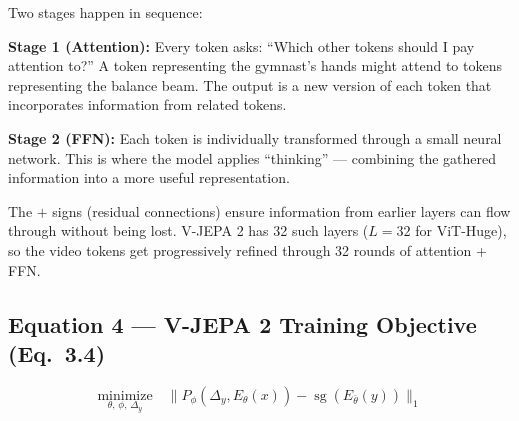 \documentclass[12pt, a4paper]{article}
\begin{document}
\begin{analogybox}
Two stages happen in sequence:

\textbf{Stage 1 (Attention):} Every token asks: ``Which other tokens should I pay attention to?'' A token representing the gymnast's hands might attend to tokens representing the balance beam. The output is a new version of each token that incorporates information from related tokens.

\textbf{Stage 2 (FFN):} Each token is individually transformed through a small neural network. This is where the model applies ``thinking'' --- combining the gathered information into a more useful representation.

The $+$ signs (residual connections) ensure information from earlier layers can flow through without being lost. V-JEPA 2 has 32 such layers ($L=32$ for ViT-Huge), so the video tokens get progressively refined through 32 rounds of attention + FFN.
\end{analogybox}


\subsection{Equation 4 --- V-JEPA 2 Training Objective (Eq.~3.4)}

\begin{eqbox}
\[
\underset{\theta,\,\phi,\,\Delta_y}{\text{minimize}} \quad \|P_\phi(\Delta_y, E_\theta(x)) - \operatorname{sg}(E_{\bar{\theta}}(y))\|_1
\]
\end{eqbox}
\end{document}
